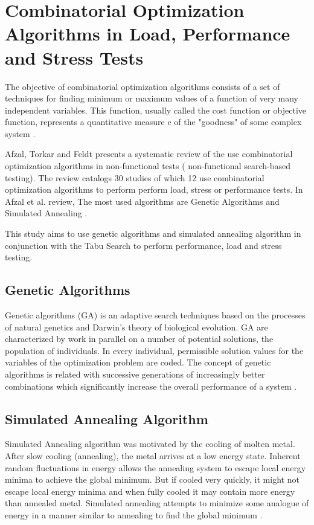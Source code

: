 \section{Combinatorial Optimization Algorithms in Load, Performance and Stress Tests}

The objective of combinatorial optimization algorithms consists of a set of  techniques for finding minimum or maximum values of a function of very many independent variables. This function, usually called the cost function or objective function, represents a quantitative measure e of the "goodness" of some complex system \cite{Kirkpatrick2007}. 

Afzal, Torkar and Feldt presents a systematic review of the use combinatorial  optimization algorithms in non-functional tests ( non-functional search-based testing). The review catalogs 30 studies of which 12 use combinatorial optimization algorithms to perform perform load, stress or performance tests. In Afzal et al. review, The most used algorithms are Genetic Algorithms and  Simulated Annealing \cite{Afzal2009a}.

This study aims to use genetic algorithms and simulated annealing algorithm in conjunction with the Tabu Search to perform performance, load and stress testing.


\subsection{Genetic Algorithms}

Genetic algorithms (GA) is an adaptive search techniques based on the processes of natural genetics and Darwin’s theory of biological evolution. GA are characterized by  work in parallel on a number of potential solutions, the population of individuals. In every individual, permissible solution values for the variables of the optimization problem are coded. The concept of genetic algorithms is related with  successive generations of increasingly better combinations which significantly increase the overall performance of a system \cite{Sullivan} \cite{goldberg1989messy}.

\subsection{Simulated Annealing Algorithm}

Simulated Annealing  algorithm was motivated by the cooling of molten metal. After slow cooling (annealing), the metal arrives at a low energy state.
Inherent random fluctuations in energy allows the annealing system to escape local energy minima to achieve the global minimum. But if cooled very quickly, it might not escape local energy minima and when fully cooled it may contain more energy than annealed metal. Simulated annealing attempts to minimize some analogue of energy in a manner similar to annealing to find the global minimum \cite{Goffe1994}.

